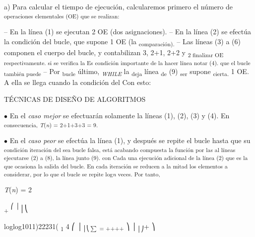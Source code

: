 \documentclass[12pt]{article}
\renewcommand{\_}{\kern-1.5pt\textunderscore\kern-1.5pt}
\begin{document}
{\fontsize{10pt}{12.0pt}\selectfont a) Para calcular el tiempo de ejecución, calcularemos primero el número de \textsubscript{operaciones elementales (OE) que se realizan: }\par}\par

{\fontsize{10pt}{12.0pt}\selectfont – En la línea (1) se ejecutan 2 OE (dos asignaciones). – En la línea (2) se efectúa la condición del bucle, que supone 1 OE (la \textsubscript{comparación). }– Las líneas (3) a (6) componen el cuerpo del bucle, y contabilizan 3, 2+1, 2+2 y \textsubscript{2 finalizar OE respectivamente. si se verifica la Es condición importante de la hacer línea notar (4). que el bucle también puede }– Por \textsubscript{bucle }último, \textit{\textsubscript{WHILE }}la \textsubscript{deja }línea \textsubscript{de }(9) \textsubscript{ser }supone \textsubscript{cierta. }1 OE. A ella se llega cuando la condición del Con esto: \par}\par

{\fontsize{10pt}{12.0pt} {\fontsize{7pt}{8.4pt}\selectfont TÉCNICAS DE DISEÑO DE ALGORITMOS \par}\par}\par

{\fontsize{10pt}{12.0pt}\selectfont $\bullet$  En el \textit{caso mejor }se efectuarán solamente la líneas (1), (2), (3) y (4). En \textsubscript{consecuencia, \textit{T}(\textit{n}) = 2+1+3+3 = 9. }\par}\par

{\fontsize{10pt}{12.0pt}\selectfont $\bullet$  En el \textit{caso peor }se efectúa la línea (1), y después se repite el bucle hasta que su \textsubscript{condición iteración del sea bucle falsa, está acabando compuesta la función por las al líneas ejecutarse (2) a (8), la línea junto (9). con Cada una ejecución adicional de la línea (2) que es la que ocasiona la salida del bucle. En cada iteración se reducen a la mitad los elementos a considerar, por lo que el bucle se repite log\textit{n }veces. Por tanto, }\par}\par

{\fontsize{10pt}{12.0pt}\selectfont \textit{T}(\textit{n}) = 2 \par}\par

\textsubscript{+ }\textsuperscript{⎛ │}│⎝{\fontsize{7pt}{8.4pt}\selectfont loglog1011)22231( \textsubscript{1 }4 ⎛ │\textsubscript{│⎝$ \sum $ = ++++ }⎞ │\textsubscript{│⎠}+ ⎞ \par}\par
\end{document}
